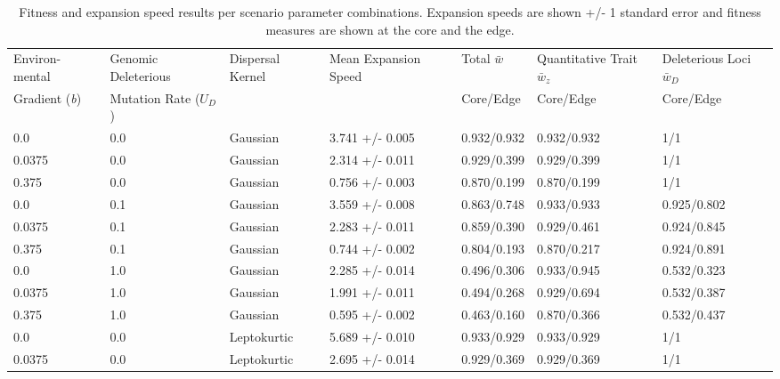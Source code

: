 \begin{table}[h]
\centering \footnotesize
\caption[Fitness and expansion speed results per scenario parameter combinations]{Fitness and expansion speed results per scenario parameter combinations. Expansion speeds are shown +/- 1 standard error and fitness measures are shown at the core and the edge.}
\label{tab:paramresults}
\begin{tabular}{p{}|p{}|p{}|p{}|p{}|p{}|p{}}
Environ- mental  		& Genomic Deleterious 	& Dispersal Kernel	& Mean Expansion Speed& Total $\bar{w}$	& Quantitative Trait $\bar{w}_z$	& Deleterious Loci $\bar{w}_D$ \\
Gradient (\emph{b})		& Mutation Rate ($U_D$)	&	  			&  			&	\tiny{Core/Edge}	&	\tiny{Core/Edge}				&	\tiny{Core/Edge}	\\ \hline \hline
0.0                       	&	0.0	& Gaussian         &	3.741 +/- 0.005	&	0.932/0.932	&	0.932/0.932	&	1/1	\\
0.0375                    	&	0.0	& Gaussian         &	2.314 +/- 0.011	&	0.929/0.399	&	0.929/0.399	&	1/1	\\
0.375                     	&	0.0	& Gaussian         &	0.756 +/- 0.003	&	0.870/0.199	&	0.870/0.199	&	1/1	\\ \hline
0.0                       	&	0.1	& Gaussian         &	3.559 +/- 0.008	&	0.863/0.748	&	0.933/0.933	&	0.925/0.802	\\
0.0375                    	&	0.1	& Gaussian         &	2.283 +/- 0.011	&	0.859/0.390	&	0.929/0.461	&	0.924/0.845	\\
0.375                     	&	0.1	& Gaussian         &	0.744 +/- 0.002	&	0.804/0.193	&	0.870/0.217	&	0.924/0.891	\\ \hline
0.0                       	&	1.0	& Gaussian         &	2.285 +/- 0.014	&	0.496/0.306	&	0.933/0.945	&	0.532/0.323	\\
0.0375                    	&	1.0	& Gaussian         &	1.991 +/- 0.011	&	0.494/0.268	&	0.929/0.694	&	0.532/0.387	\\
0.375                     	&	1.0	& Gaussian         &	0.595 +/- 0.002	&	0.463/0.160	&	0.870/0.366	&	0.532/0.437	\\ \hline
0.0                       	&	0.0	& Leptokurtic      &	5.689 +/- 0.010	&	0.933/0.929	&	0.933/0.929	&	1/1	\\
0.0375                    	&	0.0	& Leptokurtic      &	2.695 +/- 0.014	&	0.929/0.369	&	0.929/0.369	&	1/1	\\

\end{tabular}
\end{table}
